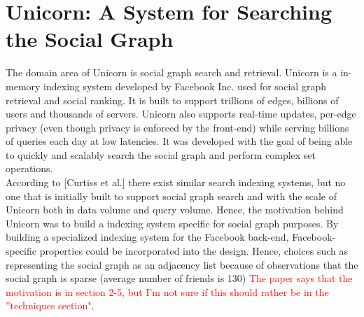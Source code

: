 \documentclass{article}
\begin{document}
\section*{Unicorn: A System for Searching the Social Graph}

The domain area of Unicorn is social graph search and retrieval. Unicorn is a in-memory indexing system developed by Facebook Inc. used for social graph retrieval and social ranking. It is built to support trillions of edges, billions of users and thousands of servers. Unicorn also supports real-time updates, per-edge privacy (even though privacy is enforced by the front-end) while serving billions of queries each day at low latencies. It was developed with the goal of being able to quickly and scalably search the social graph and perform complex set operations. \\

\noindent According to [Curtiss et al.] there exist similar search indexing systems, but no one that is initially built to support social graph search and with the scale of Unicorn both in data volume and query volume. Hence, the motivation behind Unicorn was to build a indexing system specific for social graph purposes. By building a specialized indexing system for the Facebook back-end, Facebook-specific properties could be incorporated into the design. Hence, choices such as representing the social graph as an adjacency list because of observations that the social graph is sparse (average number of friends is 130) \textcolor{red}{The paper says that the motivation is in section 2-5, but I'm not sure if this should rather be in the ''techniques section"}.\\



\end{document}
